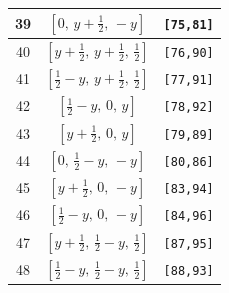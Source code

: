 \documentclass[fleqn,8pt]{jsarticle}
\begin{document}
\begin{longtable}{ccc}
39 & $\left[ 0,\, y + \frac{1}{2},\, - y \right]$ & {\tt [75,81]} \\ \hline
40 & $\left[ y + \frac{1}{2},\, y + \frac{1}{2},\, \frac{1}{2} \right]$ & {\tt [76,90]} \\ \hline
41 & $\left[ \frac{1}{2} - y,\, y + \frac{1}{2},\, \frac{1}{2} \right]$ & {\tt [77,91]} \\ \hline
42 & $\left[ \frac{1}{2} - y,\, 0,\, y \right]$ & {\tt [78,92]} \\ \hline
43 & $\left[ y + \frac{1}{2},\, 0,\, y \right]$ & {\tt [79,89]} \\ \hline
44 & $\left[ 0,\, \frac{1}{2} - y,\, - y \right]$ & {\tt [80,86]} \\ \hline
45 & $\left[ y + \frac{1}{2},\, 0,\, - y \right]$ & {\tt [83,94]} \\ \hline
46 & $\left[ \frac{1}{2} - y,\, 0,\, - y \right]$ & {\tt [84,96]} \\ \hline
47 & $\left[ y + \frac{1}{2},\, \frac{1}{2} - y,\, \frac{1}{2} \right]$ & {\tt [87,95]} \\ \hline
48 & $\left[ \frac{1}{2} - y,\, \frac{1}{2} - y,\, \frac{1}{2} \right]$ & {\tt [88,93]} \\
\end{longtable}
\renewcommand{\arraystretch}{1.2}
\end{document}
